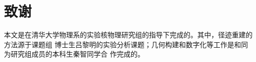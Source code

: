 \chapter*{致谢}
本文是在清华大学物理系的实验核物理研究组的指导下完成的。其中，径迹重建的方法源于课题组
博士生吕黎明的实验分析课题；几何构建和数字化等工作是和同为研究组成员的本科生秦智同学合
作完成的。
\cleardoublepage
